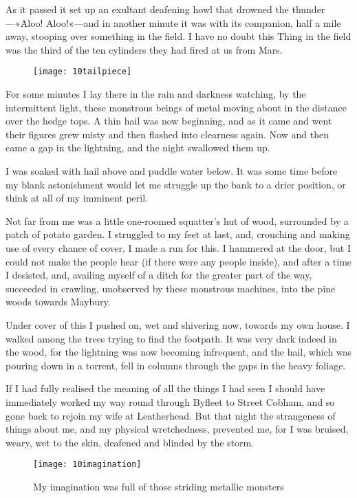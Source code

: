 As it passed it set up an exultant deafening howl that drowned the thunder—»Aloo! Aloo!«—and in another minute it was with its companion, half a mile away, stooping over something in the field. I have no doubt this Thing in the field was the third of the ten cylinders they had fired at us from Mars.

\begin{wrapfigure}{O}{0.5\textwidth}
\centering
\texttt{[image: 10tailpiece]}
\end{wrapfigure}

For some minutes I lay there in the rain and darkness watching, by the intermittent light, these monstrous beings of metal moving about in the distance over the hedge tops. A thin hail was now beginning, and as it came and went their figures grew misty and then flashed into clearness again. Now and then came a gap in the lightning, and the night swallowed them up.

I was soaked with hail above and puddle water below. It was some time before my blank astonishment would let me struggle up the bank to a drier position, or think at all of my imminent peril.

Not far from me was a little one-roomed squatter's hut of wood, surrounded by a patch of potato garden. I struggled to my feet at last, and, crouching and making use of every chance of cover, I made a run for this. I hammered at the door, but I could not make the people hear (if there were any people inside), and after a time I desisted, and, availing myself of a ditch for the greater part of the way, succeeded in crawling, unobserved by these monstrous machines, into the pine woods towards Maybury.

Under cover of this I pushed on, wet and shivering now, towards my own house. I walked among the trees trying to find the footpath. It was very dark indeed in the wood, for the lightning was now becoming infrequent, and the hail, which was pouring down in a torrent, fell in columns through the gaps in the heavy foliage.

If I had fully realised the meaning of all the things I had seen I should have immediately worked my way round through Byfleet to Street Cobham, and so gone back to rejoin my wife at Leatherhead. But that night the strangeness of things about me, and my physical wretchedness, prevented me, for I was bruised, weary, wet to the skin, deafened and blinded by the storm.

\begin{sidewaysfigure}
\texttt{[image: 10imagination]}
\caption{My imagination was full of those striding metallic monsters}
\end{sidewaysfigure}


